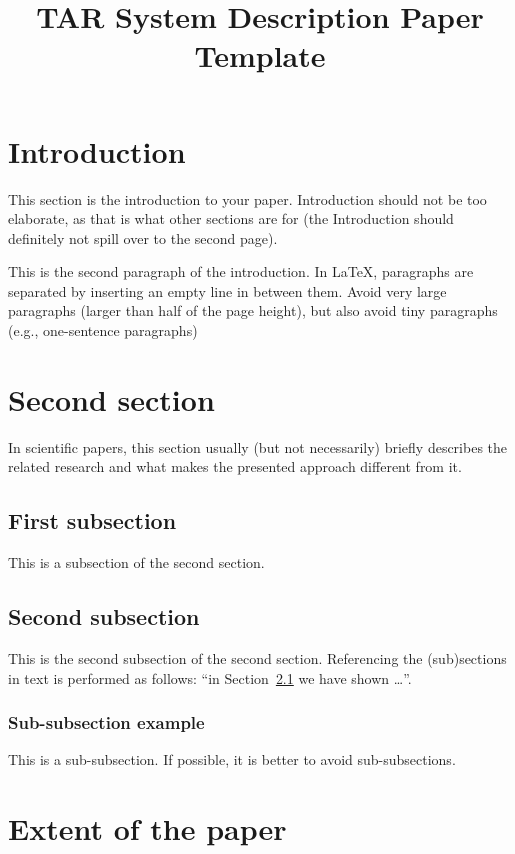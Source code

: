 \documentclass[10pt, a4paper]{article}
\title{TAR System Description Paper Template}
\begin{document}
\maketitleabstract

\section{Introduction}

This section is the introduction to your paper.
Introduction should not be too elaborate, as that is what other sections are for (the Introduction should definitely not spill over to the second page).

This is the second paragraph of the introduction.
In \LaTeX , paragraphs are separated by inserting an empty line in between them.
Avoid very large paragraphs (larger than half of the page height), but also avoid tiny paragraphs (e.g., one-sentence paragraphs)

\section{Second section}

In scientific papers, this section usually (but not necessarily) briefly describes the related research and what makes the presented approach different from it.

\subsection{First subsection}
\label{sec:first}

This is a subsection of the second section.

\subsection{Second subsection}

This is the second subsection of the second section.
Referencing the (sub)sections in text is performed as follows: ``in Section~\ref{sec:first} we have shown \dots''.

\subsubsection{Sub-subsection example} 

This is a sub-subsection.
If possible, it is better to avoid sub-subsections.

\section{Extent of the paper}
\end{document}
